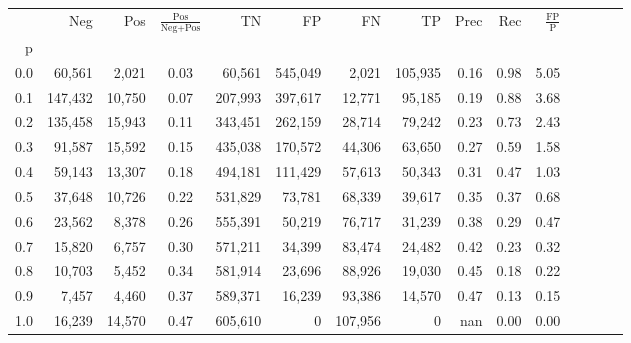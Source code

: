 \begin{tabular}{rrrcrrrrrrrrrrr}
\toprule
{} &      Neg &     Pos & $\frac{\text{Pos}}{\text{Neg}+\text{Pos}}$ &       TN &       FP &       FN &       TP &  Prec &   Rec & $\frac{\text{FP}}{\text{P}}$ \\
p   &          &         &                                            &          &          &          &          &       &       &                              \\
\midrule
0.0 &   60,561 &   2,021 &                                       0.03 &   60,561 &  545,049 &    2,021 &  105,935 &  0.16 &  0.98 &                         5.05 \\
0.1 &  147,432 &  10,750 &                                       0.07 &  207,993 &  397,617 &   12,771 &   95,185 &  0.19 &  0.88 &                         3.68 \\
0.2 &  135,458 &  15,943 &                                       0.11 &  343,451 &  262,159 &   28,714 &   79,242 &  0.23 &  0.73 &                         2.43 \\
0.3 &   91,587 &  15,592 &                                       0.15 &  435,038 &  170,572 &   44,306 &   63,650 &  0.27 &  0.59 &                         1.58 \\
0.4 &   59,143 &  13,307 &                                       0.18 &  494,181 &  111,429 &   57,613 &   50,343 &  0.31 &  0.47 &                         1.03 \\
0.5 &   37,648 &  10,726 &                                       0.22 &  531,829 &   73,781 &   68,339 &   39,617 &  0.35 &  0.37 &                         0.68 \\
0.6 &   23,562 &   8,378 &                                       0.26 &  555,391 &   50,219 &   76,717 &   31,239 &  0.38 &  0.29 &                         0.47 \\
0.7 &   15,820 &   6,757 &                                       0.30 &  571,211 &   34,399 &   83,474 &   24,482 &  0.42 &  0.23 &                         0.32 \\
0.8 &   10,703 &   5,452 &                                       0.34 &  581,914 &   23,696 &   88,926 &   19,030 &  0.45 &  0.18 &                         0.22 \\
0.9 &    7,457 &   4,460 &                                       0.37 &  589,371 &   16,239 &   93,386 &   14,570 &  0.47 &  0.13 &                         0.15 \\
1.0 &   16,239 &  14,570 &                                       0.47 &  605,610 &        0 &  107,956 &        0 &   nan &  0.00 &                         0.00 \\
\bottomrule
\end{tabular}
